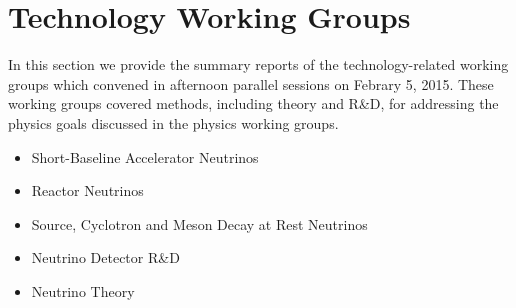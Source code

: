 \section{Technology Working Groups}
\label{sec:TechnologyWG}

In this section we provide the summary reports of the
technology-related working groups which convened in afternoon
parallel sessions on Febrary 5, 2015. These working groups covered
methods, including theory and R\&D, for addressing the physics goals
discussed in the physics working groups.


\begin{itemize}
  \item Short-Baseline Accelerator Neutrinos
  \item Reactor Neutrinos
  \item Source, Cyclotron and Meson Decay at Rest Neutrinos
  \item Neutrino Detector R\&D
  \item Neutrino Theory
\end{itemize}
